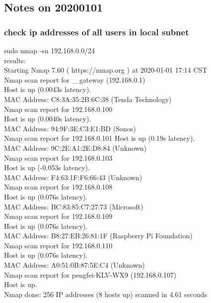 \documentclass[UTF8,fancyhdr,a4paper]{ctexart}
\begin{document}
\subsection{Notes on 20200101}

\subsubsection{check ip addresses of all users in local subnet}

sudo nmap -sn 192.168.0.0/24\\
results:\\
Starting Nmap 7.60 ( https://nmap.org ) at 2020-01-01 17:14 CST\\
Nmap scan report for \_ gateway (192.168.0.1)\\
Host is up (0.0043s latency).\\
MAC Address: C8:3A:35:2B:6C:38 (Tenda Technology)\\
Nmap scan report for 192.168.0.100\\
Host is up (0.0040s latency).\\
MAC Address: 94:9F:3E:C3:E1:BD (Sonos)\\
Nmap scan report for 192.168.0.101
Host is up (0.19s latency).\\
MAC Address: 9C:2E:A1:2E:D8:84 (Unknown)\\
Nmap scan report for 192.168.0.103\\
Host is up (-0.053s latency).\\
MAC Address: F4:63:1F:F6:66:43 (Unknown)\\
Nmap scan report for 192.168.0.108\\
Host is up (0.076s latency).\\
MAC Address: BC:83:85:C7:27:73 (Microsoft)\\
Nmap scan report for 192.168.0.109\\
Host is up (0.076s latency).\\
MAC Address: B8:27:EB:26:81:1F (Raspberry Pi Foundation)\\
Nmap scan report for 192.168.0.110\\
Host is up (0.076s latency).\\
MAC Address: A0:51:0B:87:5E:C4 (Unknown)\\
Nmap scan report for pengfei-KLV-WX9 (192.168.0.107)\\
Host is up.\\
Nmap done: 256 IP addresses (8 hosts up) scanned in 4.61 seconds\\
\end{document}
